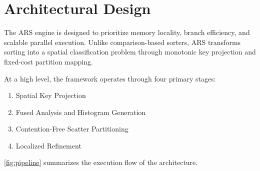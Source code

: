 \section{Architectural Design} \label{sec:methodology}
The ARS engine is designed to prioritize memory locality, branch efficiency, and scalable parallel execution.
Unlike comparison-based sorters, ARS transforms sorting into a spatial classification problem through monotonic key projection and fixed-cost partition mapping.

At a high level, the framework operates through four primary stages:
\begin{enumerate}
  \item Spatial Key Projection
  \item Fused Analysis and Histogram Generation
  \item Contention-Free Scatter Partitioning
  \item Localized Refinement
\end{enumerate}

\cref{fig:pipeline} summarizes the execution flow of the architecture.

